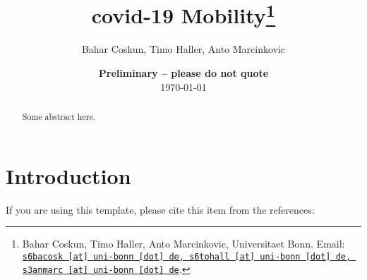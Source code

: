 \documentclass[11pt, a4paper, leqno]{article}
\begin{document}
\title{covid-19 Mobility\thanks{Bahar Coskun, Timo Haller, Anto Marcinkovic, Universitaet Bonn. Email: \href{mailto:s6bacosk@uni-bonn.de, s6tohall@uni-bonn.de, s3anmarc@uni-bonn.de}{\nolinkurl{s6bacosk [at] uni-bonn [dot] de, s6tohall [at] uni-bonn [dot] de, s3anmarc [at] uni-bonn [dot] de}}.}}

\author{Bahar Coskun, Timo Haller, Anto Marcinkovic}

\date{
    {\bf Preliminary -- please do not quote}
    \\[1ex]
    \today
}

\maketitle


\begin{abstract}
    Some abstract here.
\end{abstract}
\clearpage

\tableofcontents
\clearpage

\section{Introduction} %
\label{sec:introduction}

If you are using this template, please cite this item from the references: \citet{GaudeckerEconProjectTemplates}


\newpage
	
\begin{table}
	\centering
	\scalebox{0.8}{%
	
}
\end{table}

\newpage

\begin{table}
	\centering
	\scalebox{0.8}{%
		
	}
\end{table}

\newpage

\begin{table}
	\centering
	\scalebox{0.8}{%
		
	}
\end{table}

\newpage

\begin{table}
	\centering
	\scalebox{0.8}{%
		
	}
\end{table}

\newpage

\begin{table}
	\centering
	\scalebox{0.8}{%
		
	}
\end{table}

\clearpage

\printbibliography
{}





\end{document}
